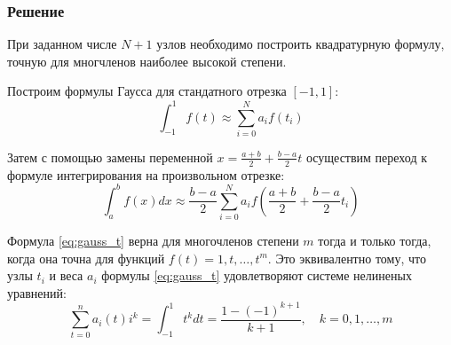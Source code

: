 \documentclass[a4paper, fontsize=14pt]{article}
\begin{document}
\subsubsection*{Решение}
    При заданном числе $N+1$ узлов необходимо построить квадратурную формулу, точную для многчленов наиболее высокой степени.
    
    Построим формулы Гаусса для стандатного отрезка $[-1, 1]$:
    \begin{equation}
        \label{eq:gauss_t}
        \int_{-1}^1 f(t) \approx \sum_{i = 0}^N a_i f(t_i)
    \end{equation}

    Затем с помощью замены переменной $x = \frac{a+b}{2} + \frac{b - a}{2} t$ осуществим переход 
    к формуле интегрирования на произвольном отрезке:
    \begin{equation}
        \label{eq:gauss_x}
        \int_a^b f(x) dx \approx \frac{b - a}{2} \sum_{i=0}^N a_i f\left( \frac{a+b}{2} + \frac{b - a}{2} t_i\right)
    \end{equation}

    Формула \eqref{eq:gauss_t} верна для многочленов степени $m$ тогда и только тогда, когда она точна для функций $f(t) = 1, t, \dots, t^m$. Это эквивалентно тому, что узлы $t_i$ и веса $a_i$ формулы \eqref{eq:gauss_t}
    удовлетворяют системе нелиненых уравнений:
    \begin{equation}
        \label{eq:gauss_at}
        \sum_{t=0}^n a_i(t)i^k = \int_{-1}^1 t^k dt = \frac{1 - (-1)^{k+1}}{k+1}, \quad k = 0, 1, \dots, m
    \end{equation}
\end{document}

